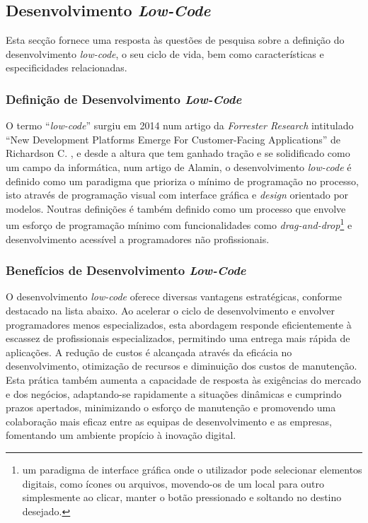 
    \subsection{Desenvolvimento \textit{Low-Code}}\label{sec:low-code}

        Esta secção fornece uma resposta às questões de pesquisa sobre a definição do desenvolvimento \textit{low-code}, o seu ciclo de vida, bem como características e especificidades relacionadas.

        \subsubsection{Definição de Desenvolvimento \textit{Low-Code}}\label{secsec:defining_low-code}

            O termo ``\textit{low-code}'' surgiu em 2014 num artigo da \textit{Forrester Research} intitulado ``New Development Platforms Emerge For Customer-Facing Applications'' de Richardson C. \cite{bock2021lowcode,sanchis2020lowcode,bucaioni2022modelling,diruscio2022lowcode}, e desde a altura que tem ganhado tração e se solidificado como um campo da informática, num artigo de Alamin, \cite{alamin2021empirical} o desenvolvimento \textit{low-code} é definido como um paradigma que prioriza o mínimo de programação no processo, isto através de programação visual com interface gráfica e \textit{design} orientado por modelos. Noutras definições é também definido como um processo que envolve um esforço de programação mínimo com funcionalidades como \textit{drag-and-drop}\footnote{um paradigma de interface gráfica onde o utilizador pode selecionar elementos digitais, como ícones ou arquivos, movendo-os de um local para outro simplesmente ao clicar, manter o botão pressionado e soltando no destino desejado.} e desenvolvimento acessível a programadores não profissionais\cite{rokis2023exploring}.

        \subsubsection{Benefícios de Desenvolvimento \textit{Low-Code}}\label{secsec:beneficios_low-code}

            O desenvolvimento \textit{low-code} oferece diversas vantagens estratégicas, conforme destacado na lista abaixo. Ao acelerar o ciclo de desenvolvimento e envolver programadores menos especializados, esta abordagem responde eficientemente à escassez de profissionais especializados, permitindo uma entrega mais rápida de aplicações. A redução de custos é alcançada através da eficácia no desenvolvimento, otimização de recursos e diminuição dos custos de manutenção. Esta prática também aumenta a capacidade de resposta às exigências do mercado e dos negócios, adaptando-se rapidamente a situações dinâmicas e cumprindo prazos apertados, minimizando o esforço de manutenção e promovendo uma colaboração mais eficaz entre as equipas de desenvolvimento e as empresas, fomentando um ambiente propício à inovação digital\cite{rokis2023exploring,yan2021impacts}.

